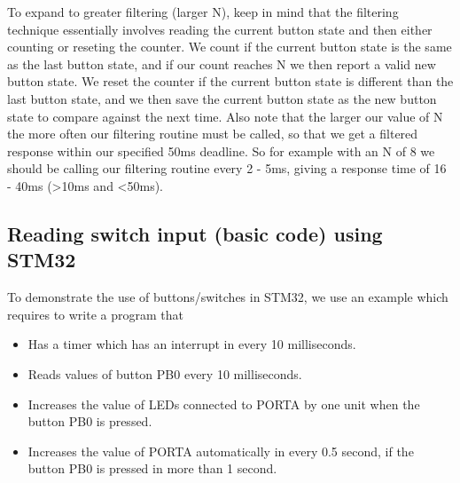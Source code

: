 To expand to greater filtering (larger N), keep in mind that the filtering technique essentially involves reading the current button state and then either counting or reseting the counter.  We count if the current button state is the same as the last button state, and if our count reaches N we then report a valid new button state.  We reset the counter if the current button state is different than the last button state, and we then save the current button state as the new button state to compare against the next time.  Also note that the larger our value of N the more often our filtering routine must be called, so that we get a filtered response within our specified 50ms deadline.  So for example with an N of 8 we should be calling our filtering routine every 2 - 5ms, giving a response time of 16 - 40ms (>10ms and <50ms).


\newpage
\subsection{Reading switch input (basic code) using STM32}


To demonstrate the use of buttons/switches in STM32, we use an example which requires to write a program that 
\begin{itemize}
    \item Has a timer which has an interrupt in every 10 milliseconds.  
    \item Reads values of button PB0 every 10 milliseconds. 
    \item Increases the value of LEDs connected to PORTA by one unit when the button PB0 is pressed.
    \item Increases the value of PORTA automatically in every 0.5 second, if the button PB0 is pressed in more than 1 second.

\end{itemize}
